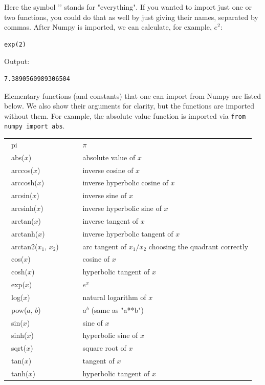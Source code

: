 \documentclass[article,A4,12pt]{llncs}
\begin{document}
\noindent
Here the symbol '{\tt *}' stands for "everything". If you wanted to import just one or two 
functions, you could do that as well by just giving their names, separated by commas. 
After Numpy is imported, we can calculate, for example, $e^2$:\\

\begin{bbox}
\begin{verbatim}
exp(2)
\end{verbatim}
\end{bbox}
\vspace{6mm}

\noindent
Output:\\

\begin{ybox}
\begin{verbatim}
7.3890560989306504
\end{verbatim}
\end{ybox}
\vspace{6mm}

\noindent
Elementary functions (and constants) that one can import from Numpy are listed
below. We also show their arguments for clarity, but the functions are imported without 
them. For example, the absolute value function is imported via {\tt from numpy import abs}.\\

\begin{center}
\begin{tabular}{|l|l|}
\hline
\ pi &  \ $\pi$\\
\ abs($x$) &\   absolute value of $x$\\
\ arccos($x$) &\   inverse cosine of $x$ \\
\ arccosh($x$) &\   inverse hyperbolic cosine of $x$ \\
\ arcsin($x$) &\  inverse sine of $x$ \\
\ arcsinh($x$) &\  inverse hyperbolic sine of $x$ \\
\ arctan($x$) &\  inverse tangent of $x$ \\
\ arctanh($x$) &\  inverse hyperbolic tangent of $x$ \\
\ arctan2($x_1$, $x_2$) \ \ \ &\  arc tangent of $x_1/x_2$ choosing the quadrant correctly \\
\ cos($x$) &\  cosine of $x$ \\
\ cosh($x$) &\  hyperbolic tangent of $x$ \\
\ exp($x$) &\  $e^x$ \\
\ log($x$) &\  natural logarithm of $x$ \\
\ pow($a$, $b$) &\  $a^b$ (same as "a**b")\\
\ sin($x$) &\  sine of $x$ \\
\ sinh($x$) &\  hyperbolic sine of $x$ \\
\ sqrt($x$) &\  square root of $x$ \\
\ tan($x$) &\  tangent of $x$\\
\ tanh($x$) &\  hyperbolic tangent of $x$ \\
\hline
\end{tabular}
\end{center}
\vspace{4mm}
\noindent
\end{document}
